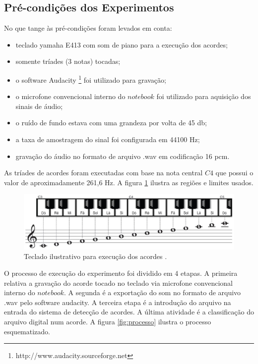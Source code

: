 \subsection{Pré-condições dos Experimentos}
\label{sec:precondicoes}

No que tange às pré-condições foram levados em conta:
\begin{itemize}
    \item teclado yamaha E413 com som de piano para a execução dos acordes;
    \item somente tríades (3 notas) tocadas;
    \item o software Audacity \footnote{http://www.audacity.sourceforge.net} foi utilizado para gravação;
    \item o microfone convencional interno do $notebook$ foi utilizado para aquisição dos sinais de áudio;
    \item o ruído de fundo estava com uma grandeza por volta de 45 db;
    \item a taxa de amostragem do sinal foi configurada em 44100 Hz;
    \item gravação do áudio no formato de arquivo .wav em codificação 16 pcm.
\end{itemize}


As tríades de acordes foram executadas com base na nota central $C4$ que possui o valor de aproximadamente 261,6 Hz. A figura \ref{fig:teclado} ilustra as regiões e limites usados.

\begin{figure}[h]
	\centering
		\includegraphics[keepaspectratio=true,scale=0.4]{figuras/teclado-tcc1.eps}
	\caption{Teclado ilustrativo para execução dos acordes \cite{teclado}.}
  \label{fig:teclado}
\end{figure}

O processo de execução do experimento foi dividido em 4 etapas. A primeira relativa a gravação do acorde tocado no teclado via microfone convencional interno do $notebook$. A segunda é a exportação do som no formato de arquivo .wav pelo software audacity. A terceira etapa é a introdução do arquivo na entrada do sistema de detecção de acordes. A última atividade é a classificação do arquivo digital num acorde. A figura \ref{fig:processo} ilustra o processo esquematizado.

